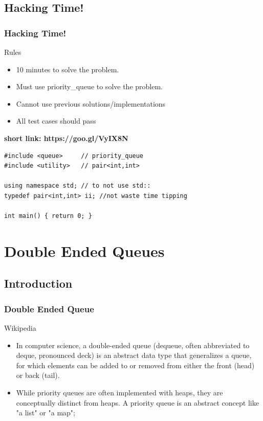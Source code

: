 \documentclass{beamer}
\begin{document}
\subsection{Hacking Time!}
\begin{frame}[fragile]
\frametitle{ Hacking Time! }
\begin{block}{Rules}
	\begin{multicols}{2}
	\begin{itemize}
		\item 10 minutes to solve the problem.
		\item Must use priority\_queue to solve the problem.
		\item Cannot use previous solutions/implementations
		\item All test cases should pass 
	\end{itemize}
	\end{multicols}
	\textbf{short link: https://goo.gl/VyIX8N}
\end{block}
\begin{example}[ Template ]
\begin{lstlisting}
#include <queue>     // priority_queue
#include <utility>   // pair<int,int>

using namespace std; // to not use std::
typedef pair<int,int> ii; //not waste time tipping

int main() { return 0; } 
\end{lstlisting}
\end{example}

\end{frame}
\section{Double Ended Queues} 
\subsection{Introduction}
\begin{frame}
\frametitle{Double Ended Queue}
\begin{block}{Wikipedia}
\begin{itemize}
\item In computer science, a double-ended queue (dequeue, often abbreviated to deque, pronounced deck) is an abstract data type that generalizes a queue, for which elements can be added to or removed from either the front (head) or back (tail). 
\\
\item While priority queues are often implemented with heaps, they are conceptually distinct from heaps. A priority queue is an abstract concept like "a list" or "a map";
\end{itemize}
\end{block}
\end{frame}
\end{document}
